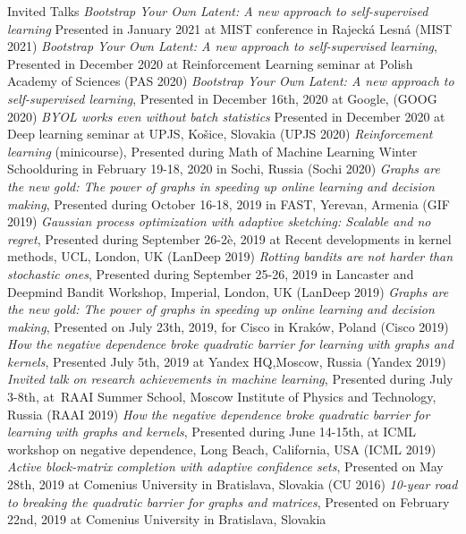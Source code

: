 \documentclass{resume}
\begin{document}
\begin{category}{Invited Talks}
\citembullet
\emph{Bootstrap Your Own Latent: A new approach to self-supervised learning} 
Presented in January  2021 at MIST conference in Rajeck\' a Lesn\' a 
({\sf MIST  2021})
\citembullet
\emph{Bootstrap Your Own Latent: A new approach to self-supervised learning}, 
 Presented in December  2020 at Reinforcement Learning seminar at Polish Academy of Sciences
({\sf PAS  2020})
\citembullet
\emph{Bootstrap Your Own Latent: A new approach to self-supervised learning}, 
Presented in December 16th, 2020 at Google,
({\sf GOOG  2020})
\citembullet
\emph{BYOL works even without batch statistics} 
Presented in December  2020 at Deep learning seminar at UPJS, Ko\v{s}ice, Slovakia
({\sf UPJS  2020})
\citembullet
\emph{Reinforcement learning} (minicourse),
Presented during Math of Machine Learning Winter Schoolduring in February 19-18, 2020 in Sochi, Russia 
({\sf Sochi  2020})
\citembullet
\emph{Graphs are the new gold: The power of graphs in speeding up online learning and decision making},
Presented during October 16-18, 2019 in FAST, Yerevan, Armenia 
({\sf GIF  2019})
\citembullet
\emph{Gaussian process optimization with adaptive sketching: Scalable and no regret},
Presented during September 26-2è, 2019 at Recent developments in kernel methods, UCL, London, UK
({\sf LanDeep 2019})
\citembullet
\emph{Rotting bandits are not harder than stochastic ones},
Presented during September 25-26, 2019 in Lancaster and Deepmind Bandit Workshop, Imperial, London, UK
({\sf LanDeep 2019})
\citembullet
\emph{Graphs are the new gold: The power of graphs in speeding up online learning and decision making},
Presented on July 23th, 2019, for Cisco in Krak\'ow, Poland
({\sf Cisco  2019})
\citembullet
\emph{How the negative dependence broke quadratic barrier for learning with graphs and kernels},
Presented July 5th, 2019 at Yandex HQ,Moscow, Russia
({\sf Yandex  2019})
\citembullet
\emph{Invited talk on research achievements in machine learning},
Presented during July 3-8th, at~RAAI Summer School, Moscow Institute of Physics and Technology, Russia
({\sf RAAI  2019})
\citembullet
\emph{How the negative dependence broke quadratic barrier for learning with graphs and kernels},
Presented during June 14-15th, at ICML workshop on negative dependence, Long Beach, California, USA 
({\sf ICML  2019})
\citembullet
\emph{Active block-matrix completion with adaptive confidence sets}, Presented on May 28th, 2019 at Comenius University in Bratislava, Slovakia 
({\sf CU 2016})
\citembullet
\emph{10-year road to breaking the quadratic barrier for graphs and matrices}, Presented on February 22nd, 2019 at Comenius University in Bratislava, Slovakia 

\end{category}
\end{document}
